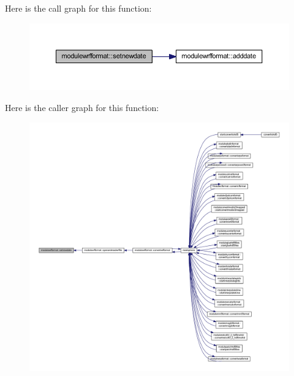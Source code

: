 Here is the call graph for this function\+:\nopagebreak
\begin{figure}[H]
\begin{center}
\leavevmode
\includegraphics[width=350pt]{namespacemodulewrfformat_a059682013c76ca30c57ffaaa268179f3_cgraph}
\end{center}
\end{figure}
Here is the caller graph for this function\+:\nopagebreak
\begin{figure}[H]
\begin{center}
\leavevmode
\includegraphics[width=350pt]{namespacemodulewrfformat_a059682013c76ca30c57ffaaa268179f3_icgraph}
\end{center}
\end{figure}
\mbox{\label{namespacemodulewrfformat_a2b4e995c72ac3a14b042542f4fe14c13}} 
